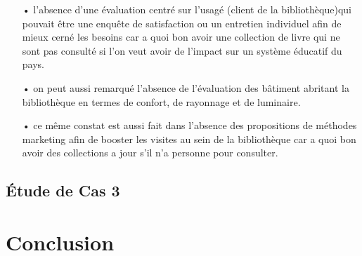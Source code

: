 \documentclass[french,a4paper,12pt]{article}
\begin{document}
\begin{enumerate}
\item[•] l'absence d'une évaluation centré sur l'usagé (client de la bibliothèque)qui pouvait être une enquête de satisfaction ou un entretien individuel afin de mieux cerné les besoins car a quoi bon avoir une collection de livre qui ne sont pas consulté si l'on veut avoir de l'impact sur un système éducatif du pays.
\item[•] on peut aussi remarqué l'absence de l'évaluation des bâtiment abritant la bibliothèque en termes de confort, de rayonnage et de luminaire. 
\item[•] ce même constat est aussi fait dans l'absence des propositions de méthodes marketing afin de booster les visites au sein de la bibliothèque car a quoi bon avoir des collections a jour s'il n'a personne pour consulter.
\end{enumerate} 

\newpage
\subsection{Étude de Cas 3}

\newpage
\section{Conclusion}






\newpage
\begin{center}
\listoffigures
\end{center}

\newpage

\begin{center}

 
\end{center}
\end{document}
